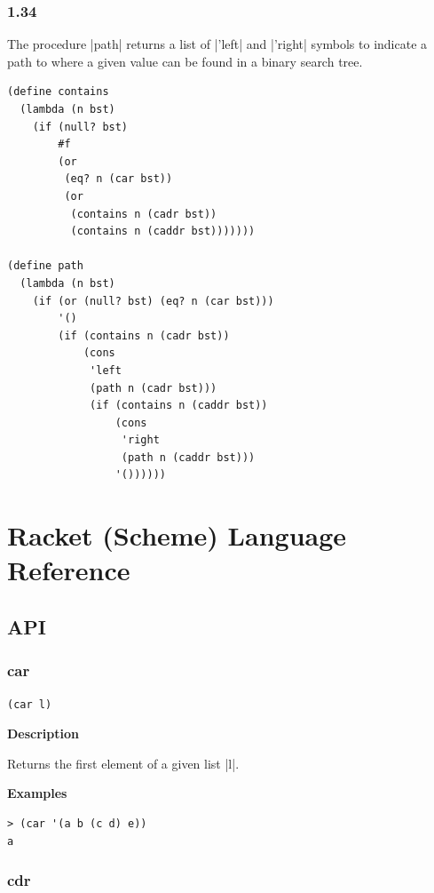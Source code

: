 \documentclass[a4paper]{article}
\begin{document}
\subsubsection*{1.34}

The procedure |path| returns a list of |'left| and |'right| symbols to indicate a path to where a given value can be found in a binary search tree.

\begin{lstlisting}
(define contains
  (lambda (n bst)
    (if (null? bst)
        #f
        (or
         (eq? n (car bst))
         (or
          (contains n (cadr bst))
          (contains n (caddr bst)))))))

(define path
  (lambda (n bst)
    (if (or (null? bst) (eq? n (car bst)))
        '()
        (if (contains n (cadr bst))
            (cons
             'left
             (path n (cadr bst)))
             (if (contains n (caddr bst))
                 (cons
                  'right
                  (path n (caddr bst)))
                 '())))))
\end{lstlisting}

\newpage

\section{Racket (Scheme) Language Reference}

\subsection{API}

\subsubsection{car}

\begin{lstlisting}[frame=none]
(car l)
\end{lstlisting}

\textbf{Description}

Returns the first element of a given list |l|.

\textbf{Examples}

\begin{lstlisting}
> (car '(a b (c d) e))
a
\end{lstlisting}

\subsubsection{cdr}
\end{document}

